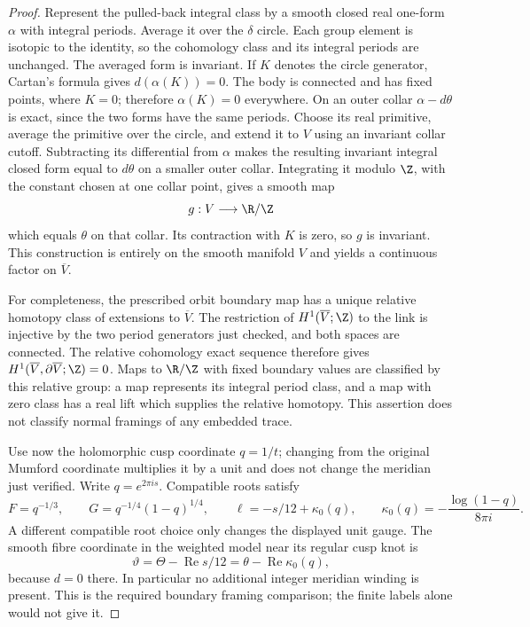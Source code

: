 \begin{proof}
Represent the pulled-back integral class by a smooth closed real
one-form $\alpha$ with integral periods. Average it over the
$\delta$ circle. Each group element is isotopic to the identity,
so the cohomology class and its integral periods are unchanged.
The averaged form is invariant. If $K$ denotes the circle
generator, Cartan's formula gives $d(\alpha(K))=0$.
The body is connected and has fixed points, where $K=0$;
therefore $\alpha(K)=0$ everywhere.
On an outer collar $\alpha-d\theta$ is exact, since the two
forms have the same periods. Choose its real primitive,
average the primitive over the circle, and extend it to $V$
using an invariant collar cutoff. Subtracting its differential
from $\alpha$ makes the resulting invariant integral closed
form equal to $d\theta$ on a smaller outer collar. Integrating
it modulo $\Z$, with the constant chosen at one collar point,
gives a smooth map
\[
 g:V\longrightarrow\R/\Z
\]
which equals $\theta$ on that collar. Its contraction with $K$
is zero, so $g$ is invariant. This construction is entirely on
the smooth manifold $V$ and yields a continuous factor on
$\overline V$.

For completeness, the prescribed orbit boundary map has a
unique relative homotopy class of extensions to $\overline V$.
The restriction of $H^1(\overline V;\Z)$ to the link is
injective by the two period generators just checked, and both
spaces are connected. The relative cohomology exact sequence
therefore gives $H^1(\overline V,\partial\overline V;\Z)=0$.
Maps to $\R/\Z$ with fixed boundary values are classified by
this relative group: a map represents its integral period class,
and a map with zero class has a real lift which supplies the
relative homotopy. This assertion does not classify normal
framings of any embedded trace.

Use now the holomorphic cusp coordinate $q=1/t$; changing from
the original Mumford coordinate multiplies it by a unit and
does not change the meridian just verified. Write
$q=e^{2\pi i s}$. Compatible roots satisfy
\[
 F=q^{-1/3},\qquad G=q^{-1/4}(1-q)^{1/4},\qquad
 \ell=-s/12+\kappa_0(q),\qquad
 \kappa_0(q)=-\frac{\log(1-q)}{8\pi i}.
\]
A different compatible root choice only changes the displayed
unit gauge. The smooth fibre coordinate in the weighted model
near its regular cusp knot is
\begin{equation}\label{eq:C13-cusp-gauge}
 \vartheta=\Theta-\operatorname{Re}s/12
           =\theta-\operatorname{Re}\kappa_0(q),
\end{equation}
because $d=0$ there. In particular no additional integer
meridian winding is present. This is the required boundary
framing comparison; the finite labels alone would not give it.


\end{proof}
